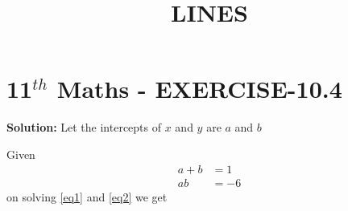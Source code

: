 \documentclass[10pt]{article}
\newcommand{\solution}{\noindent \textbf{Solution: }}
\begin{document}
\begin{center}
\title{\textbf{LINES}}
\date{\vspace{-5ex}} %
\maketitle
\end{center}

\section*{11$^{th}$ Maths - EXERCISE-10.4}


\solution
Let the intercepts of $x$ and $y$ are $a$ and $b$\\

\begin{table}[!h]
\centering

\caption{}
\label{Inputs}
\end{table}
Given
\begin{align}
a+b&=1
\label{eq1}\\
ab&=-6
\label{eq2}
\end{align} 
on solving \eqref{eq1} and \eqref{eq2} we get\\
\end{document}
